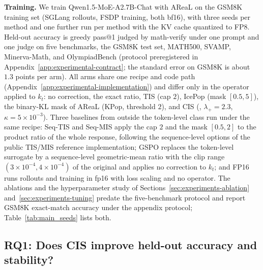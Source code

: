 \noindent\textbf{Training.}
We train Qwen1.5-MoE-A2.7B-Chat with AReaL on the GSM8K training set (SGLang rollouts, FSDP training, both bf16), with three seeds per method and one further run per method with the KV cache quantized to FP8. Held-out accuracy is greedy pass@1 judged by math-verify under one prompt and one judge on five benchmarks, the GSM8K test set, MATH500, SVAMP, Minerva-Math, and OlympiadBench (protocol preregistered in Appendix~\ref{app:experimental-contract}; the standard error on GSM8K is about $1.3$ points per arm). All arms share one recipe and code path (Appendix~\ref{app:experimental-implementation}) and differ only in the operator applied to $k_t$: no correction, the exact ratio, TIS (cap $2$), IcePop (mask $[0.5,5]$), the binary-KL mask of AReaL (KPop, threshold $2$), and CIS (, $\lambda_+=2.3$, $\kappa=5\times10^{-3}$). Three baselines from outside the token-level class run under the same recipe: Seq-TIS and Seq-MIS apply the cap $2$ and the mask $[0.5,2]$ to the product ratio of the whole response, following the sequence-level options of the public TIS/MIS reference implementation; GSPO \citep{zheng2025gspo} replaces the token-level surrogate by a sequence-level geometric-mean ratio with the clip range $(3\times10^{-4},4\times10^{-4})$ of the original and applies no correction to $k_t$; and FP16 \citep{qi2025fp16} runs rollouts and training in fp16 with loss scaling and no operator. The ablations and the hyperparameter study of Sections~\ref{sec:experiments-ablation} and~\ref{sec:experiments-tuning} predate the five-benchmark protocol and report GSM8K exact-match accuracy under the appendix protocol; Table~\ref{tab:main_seeds} lists both.

\subsection{RQ1: Does CIS improve held-out accuracy and stability?}
\label{sec:experiments-results}

